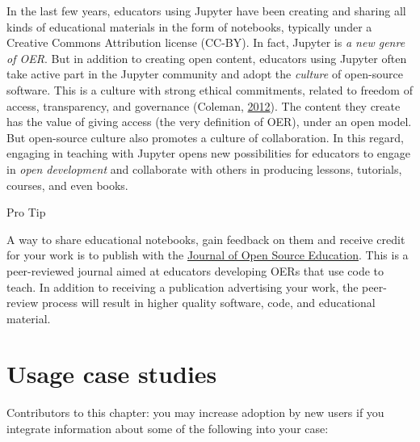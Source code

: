 \documentclass[]{book}
\let\BeginKnitrBlock\begin \let\EndKnitrBlock\end
\begin{document}
In the last few years, educators using Jupyter have been creating and
sharing all kinds of educational materials in the form of notebooks,
typically under a Creative Commons Attribution license (CC-BY). In fact,
Jupyter is \emph{a new genre of OER}. But in addition to creating open
content, educators using Jupyter often take active part in the Jupyter
community and adopt the \emph{culture} of open-source software. This is
a culture with strong ethical commitments, related to freedom of access,
transparency, and governance (Coleman,
\protect\hyperlink{ref-coleman2012coding}{2012}). The content they
create has the value of giving access (the very definition of OER),
under an open model. But open-source culture also promotes a culture of
collaboration. In this regard, engaging in teaching with Jupyter opens
new possibilities for educators to engage in \emph{open development} and
collaborate with others in producing lessons, tutorials, courses, and
even books.

\BeginKnitrBlock{rmdnote}
Pro Tip

A way to share educational notebooks, gain feedback on them and receive
credit for your work is to publish with the
\href{http://jose.theoj.org}{Journal of Open Source Education}. This is
a peer-reviewed journal aimed at educators developing OERs that use code
to teach. In addition to receiving a publication advertising your work,
the peer-review process will result in higher quality software, code,
and educational material.
\EndKnitrBlock{rmdnote}

\chapter{Usage case studies}\label{case-studies}

Contributors to this chapter: you may increase adoption by new users if
you integrate information about some of the following into your case:
\end{document}
